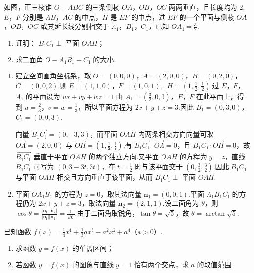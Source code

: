 \begin{problem}
如图，正三棱锥 \(O - ABC\) 的三条侧棱 \(OA\)，\(OB\)，\(OC\) 两两垂直，且长度均为 \(2\). \(E\)，\(F\) 分别是 \(AB\)，\(AC\) 的中点，\(H\) 是 \(EF\) 的中点，过 \(EF\) 的一个平面与侧棱 \(OA\)，\(OB\)，\(OC\) 或其延长线分别相交于 \(A_{1}\)，\(B_{1}\)，\(C_{1}\)，已知 \(OA_{1} = \frac{3}{2}\).

\begin{enumerate}
\item 证明： \(B_{1}C_{1}\perp\) 平面 \(OAH\)；
\item 求二面角 \(O - A_{1}B_{1} - C_{1}\) 的大小.
\end{enumerate}

\end{problem}

\begin{solution}
\begin{enumerate}
\item 建立空间直角坐标系，取 \(O=(0,0,0)\)，\(A=(2,0,0)\)，\(B=(0,2,0)\)，\(C=(0,0,2)\).则 \(E=(1,1,0)\)，\(F=(1,0,1)\)，\(H=(1,\frac12,\frac12)\).过 \(E\)，\(F\)，\(A_1\) 的平面设为 \(ux+vy+wz=1\).由 \(A_1=(\frac32,0,0)\)，\(E\)，\(F\) 在此平面上，得到 \(u=\frac23\)，\(v=w=\frac13\)，所以平面方程为 \(2x+y+z=3\).因此 \(B_1=(0,3,0)\)，\(C_1=(0,0,3)\).

向量 \(\overrightarrow{B_1C_1}=(0,-3,3)\)，而平面 \(OAH\) 内两条相交方向向量可取 \(\overrightarrow{OA}=(2,0,0)\) 与 \(\overrightarrow{OH}=(1,\frac12,\frac12)\).有 \(\overrightarrow{B_1C_1}\cdot\overrightarrow{OA}=0\)，且 \(\overrightarrow{B_1C_1}\cdot\overrightarrow{OH}=0\)，故 \(\overrightarrow{B_1C_1}\) 垂直于平面 \(OAH\) 的两个独立方向.又平面 \(OAH\) 的方程为 \(y=z\)，直线 \(B_1C_1\) 可写为 \((0,3-3t,3t)\)，在 \(t=\frac12\) 时与该平面交于 \((0,\frac32,\frac32)\).因此 \(B_1C_1\) 与平面 \(OAH\) 相交且方向垂直于该平面，从而 \(B_1C_1\perp\) 平面 \(OAH\).
\item 平面 \(OA_1B_1\) 的方程为 \(z=0\)，取其法向量 \(\mathbf{n}_1=(0,0,1)\).平面 \(A_1B_1C_1\) 的方程仍为 \(2x+y+z=3\)，取法向量 \(\mathbf{n}_2=(2,1,1)\).设二面角为 \(\theta\)，则
\(\cos\theta=\frac{|\mathbf{n}_1\cdot\mathbf{n}_2|}{|\mathbf{n}_1||\mathbf{n}_2|}=\frac1{\sqrt6}\).由于二面角取锐角，\(\tan\theta=\sqrt5\)，故 \(\theta=\arctan\sqrt5\).
\end{enumerate}
\end{solution}

\begin{problem}
已知函数 \(f(x) = \frac{1}{4}x^4 + \frac{1}{3}ax^3 - a^2x^2 + a^4\)（\(a > 0\)）.
\begin{enumerate}
\item 求函数 \(y = f(x)\) 的单调区间；
\item 若函数 \(y = f(x)\) 的图象与直线 \(y = 1\) 恰有两个交点，求 \(a\) 的取值范围.
\end{enumerate}
\end{problem}

